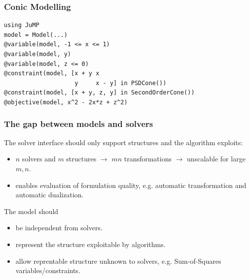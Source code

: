 \documentclass{beamer}
\begin{document}
  \begin{frame}[fragile]
    \frametitle{Conic Modelling}
\begin{verbatim}
using JuMP
model = Model(...)
@variable(model, -1 <= x <= 1)
@variable(model, y)
@variable(model, z <= 0)
@constraint(model, [x + y x
                    y     x - y] in PSDCone())
@constraint(model, [x + y, z, y] in SecondOrderCone())
@objective(model, x^2 - 2x*z + z^2)
\end{verbatim}
  \end{frame}

  \begin{frame}
    \frametitle{The gap between models and solvers}
    The solver interface should only support structures and the algorithm \alert{exploits}:
    \begin{itemize}
      \item
        $n$ solvers and $m$ structures $\to$ $mn$ transformations $\to$ \alert{unscalable} for large $m, n$.
      \item
        enables \alert{evaluation} of formulation \alert{quality}, e.g. automatic transformation and
        automatic dualization.
    \end{itemize}

    The model should
    \begin{itemize}
      \item be \alert{independent} from solvers.
      \item represent the structure \alert{exploitable} by algorithms.
      \item allow reprentable structure \alert{unknown} to solvers, e.g. Sum-of-Squares variables/constraints.
    \end{itemize}
  \end{frame}
\end{document}
